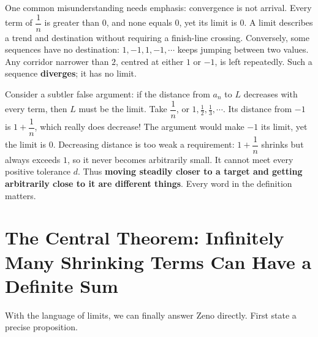 \begin{center}
\end{center}

One common misunderstanding needs emphasis: convergence is not arrival. Every term of $\dfrac{1}{n}$ is greater than $0$, and none equals $0$, yet its limit is $0$. A limit describes a trend and destination without requiring a finish-line crossing. Conversely, some sequences have no destination: $1,-1,1,-1,\cdots$ keeps jumping between two values. Any corridor narrower than $2$, centred at either $1$ or $-1$, is left repeatedly. Such a sequence \textbf{diverges}; it has no limit.

\begin{fanli}
Consider a subtler false argument: if the distance from $a_n$ to $L$ decreases with every term, then $L$ must be the limit. Take $\dfrac{1}{n}$, or $1,\frac12,\frac13,\cdots$. Its distance from $-1$ is $1+\dfrac{1}{n}$, which really does decrease! The argument would make $-1$ its limit, yet the limit is $0$. Decreasing distance is too weak a requirement: $1+\dfrac{1}{n}$ shrinks but always exceeds $1$, so it never becomes arbitrarily small. It cannot meet every positive tolerance $d$. Thus \textbf{moving steadily closer to a target and getting arbitrarily close to it are different things}. Every word in the definition matters.
\end{fanli}

\section{The Central Theorem: Infinitely Many Shrinking Terms Can Have a Definite Sum}

With the language of limits, we can finally answer Zeno directly. First state a precise proposition.

